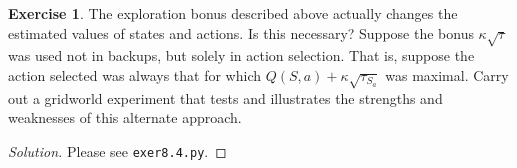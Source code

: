 \documentclass[oneside,11pt]{article}
\theoremstyle{definition}
\newtheorem{exer}[thm]{Exercise}
\newenvironment{solution}
{\renewcommand\qedsymbol{$\blacksquare$}\begin{proof}[Solution]} {\end{proof}}
\begin{document}
\begin{exer}

The exploration bonus described above actually changes the estimated values of states and actions. Is this necessary? Suppose the bonus $\kappa \sqrt{\tau}$ was used not in backups, but solely in action selection. That is, suppose the action selected was always that for which $Q(S, a) +\kappa \sqrt{\tau_{S_a}}$ was maximal. Carry out a gridworld experiment that tests and illustrates the strengths and weaknesses of this alternate approach.
\end{exer}


\begin{shaded}
\begin{solution} 
Please see \texttt{exer8.4.py}.

\end{solution} 
\end{shaded}






  
\end{document}
